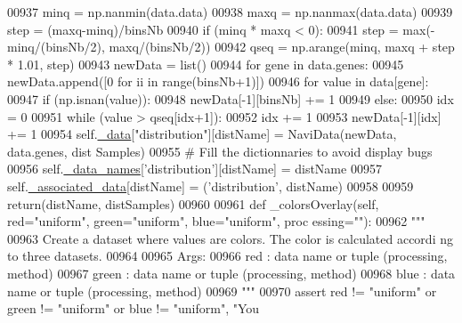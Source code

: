 \begin{DoxyCode}
00937         minq = np.nanmin(data.data)
00938         maxq = np.nanmax(data.data)
00939         step = (maxq-minq)/binsNb
00940         \textcolor{keywordflow}{if} (minq * maxq < 0):
00941             step = max(-minq/(binsNb/2), maxq/(binsNb/2))
00942         qseq = np.arange(minq, maxq + step * 1.01, step)
00943         newData = list()
00944         \textcolor{keywordflow}{for} gene \textcolor{keywordflow}{in} data.genes:
00945             newData.append([0 \textcolor{keywordflow}{for} ii \textcolor{keywordflow}{in} range(binsNb+1)])
00946             \textcolor{keywordflow}{for} value \textcolor{keywordflow}{in} data[gene]:
00947                 \textcolor{keywordflow}{if} (np.isnan(value)):
00948                     newData[-1][binsNb] += 1
00949                 \textcolor{keywordflow}{else}:
00950                     idx = 0
00951                     \textcolor{keywordflow}{while} (value > qseq[idx+1]):
00952                         idx += 1
00953                     newData[-1][idx] += 1
00954         self.\hyperlink{classnavicom_1_1navicom_1_1NaviCom_a407b2b5c30a5652ee85c4be54b3e6679}{_data}[\textcolor{stringliteral}{"distribution"}][distName] = NaviData(newData, data.genes, dist
      Samples)
00955         \textcolor{comment}{# Fill the dictionnaries to avoid display bugs}
00956         self.\hyperlink{classnavicom_1_1navicom_1_1NaviCom_ab8c34ab1a6d2a23f9b9ecee65375317a}{_data_names}[\textcolor{stringliteral}{'distribution'}][distName] = distName
00957         self.\hyperlink{classnavicom_1_1navicom_1_1NaviCom_a2e1d67aee497222ac3e508f6812d6a10}{_associated_data}[distName] = (\textcolor{stringliteral}{'distribution'}, distName)
00958 
00959         \textcolor{keywordflow}{return}(distName, distSamples)
00960 
00961     \textcolor{keyword}{def }\_colorsOverlay(self, red="uniform", green="uniform", blue="uniform", proc
      essing=""):
00962         \textcolor{stringliteral}{"""}
00963 \textcolor{stringliteral}{        Create a dataset where values are colors. The color is calculated accordi
      ng to three datasets.}
00964 \textcolor{stringliteral}{}
00965 \textcolor{stringliteral}{        Args:}
00966 \textcolor{stringliteral}{            red : data name or tuple (processing, method)}
00967 \textcolor{stringliteral}{            green : data name or tuple (processing, method)}
00968 \textcolor{stringliteral}{            blue : data name or tuple (processing, method)}
00969 \textcolor{stringliteral}{        """}
00970         \textcolor{keyword}{assert} red != \textcolor{stringliteral}{"uniform"} \textcolor{keywordflow}{or} green != \textcolor{stringliteral}{"uniform"} \textcolor{keywordflow}{or} blue != \textcolor{stringliteral}{"uniform"}, \textcolor{stringliteral}{"You 
}
\end{DoxyCode}
